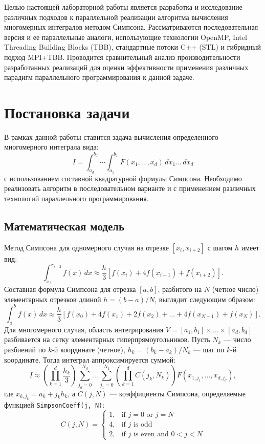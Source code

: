 \documentclass[a4paper,12pt]{article}
\begin{document}
Целью настоящей лабораторной работы является разработка и исследование различных подходов к параллельной реализации алгоритма вычисления многомерных интегралов методом Симпсона. Рассматриваются последовательная версия и ее параллельные аналоги, использующие технологии OpenMP, Intel Threading Building Blocks (TBB), стандартные потоки C++ (STL) и гибридный подход MPI+TBB. Проводится сравнительный анализ производительности разработанных реализаций для оценки эффективности применения различных парадигм параллельного программирования к данной задаче.

\newpage

\section{Постановка задачи}
\label{sec:problem_statement}

В рамках данной работы ставится задача вычисления определенного многомерного интеграла вида:
\[
I = \int_{a_d}^{b_d} \cdots \int_{a_1}^{b_1} F(x_1, \dots, x_d) \,dx_1 \dots \,dx_d
\]
с использованием составной квадратурной формулы Симпсона. Необходимо реализовать алгоритм в последовательном варианте и с применением различных технологий параллельного программирования.

\subsection{Математическая модель}
\label{ssec:math_model}
Метод Симпсона для одномерного случая на отрезке $[x_i, x_{i+2}]$ с шагом $h$ имеет вид:
\[
\int_{x_i}^{x_{i+2}} f(x) \,dx \approx \frac{h}{3} [f(x_i) + 4f(x_{i+1}) + f(x_{i+2})].
\]
Составная формула Симпсона для отрезка $[a, b]$, разбитого на $N$ (четное число) элементарных отрезков длиной $h = (b-a)/N$, выглядит следующим образом:
\[
\int_a^b f(x) \,dx \approx \frac{h}{3} [f(x_0) + 4f(x_1) + 2f(x_2) + \dots + 4f(x_{N-1}) + f(x_N)].
\]
Для многомерного случая, область интегрирования $V = [a_1, b_1] \times \dots \times [a_d, b_d]$ разбивается на сетку элементарных гиперпрямоугольников. Пусть $N_k$ — число разбиений по $k$-й координате (четное), $h_k = (b_k - a_k)/N_k$ — шаг по $k$-й координате. Тогда интеграл аппроксимируется суммой:
\[
I \approx \left( \prod_{k=1}^{d} \frac{h_k}{3} \right) \sum_{j_d=0}^{N_d} \dots \sum_{j_1=0}^{N_1} \left( \prod_{k=1}^{d} C(j_k, N_k) \right) F(x_{1,j_1}, \dots, x_{d,j_d}),
\]
где $x_{k,j_k} = a_k + j_k h_k$, а $C(j, N)$ — коэффициенты Симпсона, определяемые функцией \texttt{SimpsonCoeff(j, N)}:
\[
C(j, N) =
\begin{cases}
1, & \text{if } j=0 \text{ or } j=N \\
4, & \text{if } j \text{ is odd} \\
2, & \text{if } j \text{ is even and } 0 < j < N
\end{cases}
\]
\end{document}
